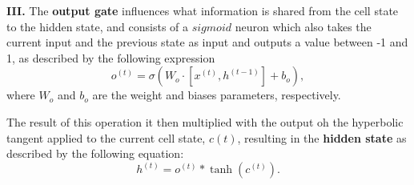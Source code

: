 \begin{description}
    \item{\textbf{III.}} 
    The \textbf{output gate} influences what information is shared from the cell state to the hidden state, and consists of a $sigmoid$ neuron which also takes the current input and the previous state as input and outputs a value between -1 and 1, as described by the following expression
        \begin{equation}
            \label{eq:outputGate}
            o^{(t)} =\sigma( W_o \cdot [x^{(t)} , h^{(t-1)}] + b_o ),
        \end{equation}
    where $W_o$ and $b_o$ are the weight and biases parameters, respectively.
    
    The result of this operation it then multiplied with the output oh the hyperbolic tangent applied to the current cell state, $c(t)$, resulting in the   \textbf{hidden state} as described by the following equation:
          \begin{equation}
            \label{eq:hiddenState}
            h^{(t)} =o^{(t)} * \tanh( c^{(t)}).
        \end{equation}  
\end{description}

